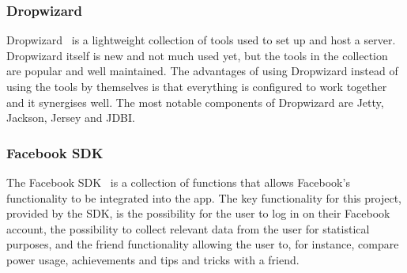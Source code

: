 
\subsubsection{Dropwizard}
Dropwizard~\cite{dropwizard} is a lightweight collection of tools used to set up and host a server. Dropwizard itself is new and not much used yet, but the tools in the collection are popular and well maintained. 
The advantages of using Dropwizard instead of using the tools by themselves is that everything is configured to work together and it synergises well. The most notable components of Dropwizard are Jetty, Jackson, Jersey and JDBI.

\subsubsection{Facebook SDK}
The Facebook SDK~\cite{fsdk} is a collection of functions that allows Facebook's functionality to be integrated into the app. The key functionality for this project, 
provided by the SDK, is the possibility for the user to log in on their Facebook account, the possibility to collect relevant data from the user for statistical purposes, and the 
friend functionality allowing the user to, for instance, compare power usage, achievements and tips and tricks with a friend. 

